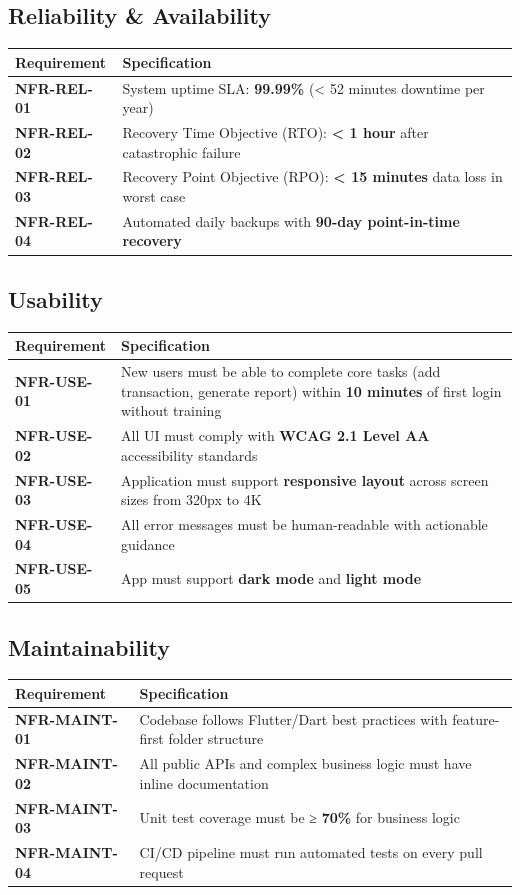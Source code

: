 \documentclass[journal, a4paper, onecolumn, 12pt]{IEEEtran}
\begin{document}
\subsection{Reliability \& Availability}

\begin{longtable}{|p{}|p{}|}
\hline
Requirement & Specification \\ \hline
\hline
\textbf{NFR-REL-01} & System uptime SLA: \textbf{99.99\%} (< 52 minutes downtime per year) \\ \hline
\textbf{NFR-REL-02} & Recovery Time Objective (RTO): \textbf{< 1 hour} after catastrophic failure \\ \hline
\textbf{NFR-REL-03} & Recovery Point Objective (RPO): \textbf{< 15 minutes} data loss in worst case \\ \hline
\textbf{NFR-REL-04} & Automated daily backups with \textbf{90-day point-in-time recovery} \\ \hline
\end{longtable}
\subsection{Usability}

\begin{longtable}{|p{}|p{}|}
\hline
Requirement & Specification \\ \hline
\hline
\textbf{NFR-USE-01} & New users must be able to complete core tasks (add transaction, generate report) within \textbf{10 minutes} of first login without training \\ \hline
\textbf{NFR-USE-02} & All UI must comply with \textbf{WCAG 2.1 Level AA} accessibility standards \\ \hline
\textbf{NFR-USE-03} & Application must support \textbf{responsive layout} across screen sizes from 320px to 4K \\ \hline
\textbf{NFR-USE-04} & All error messages must be human-readable with actionable guidance \\ \hline
\textbf{NFR-USE-05} & App must support \textbf{dark mode} and \textbf{light mode} \\ \hline
\end{longtable}
\subsection{Maintainability}

\begin{longtable}{|p{}|p{}|}
\hline
Requirement & Specification \\ \hline
\hline
\textbf{NFR-MAINT-01} & Codebase follows Flutter/Dart best practices with feature-first folder structure \\ \hline
\textbf{NFR-MAINT-02} & All public APIs and complex business logic must have inline documentation \\ \hline
\textbf{NFR-MAINT-03} & Unit test coverage must be ≥ \textbf{70\%} for business logic \\ \hline
\textbf{NFR-MAINT-04} & CI/CD pipeline must run automated tests on every pull request \\ \hline
\end{longtable}
\end{document}
